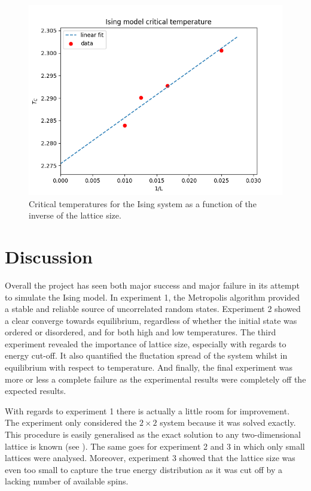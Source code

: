 \documentclass[nofootinbib,reprint,english]{revtex4-1}
\begin{document}
\begin{figure}[h!]
\centering
\includegraphics[scale=0.5]{../output/figures/experiment4/critical.png}
\caption{Critical temperatures for the Ising system as a function of the inverse of the lattice size.}\label{fig:experiment4_critical}
\end{figure}


\section{Discussion}
Overall the project has seen both major success and major failure in its attempt to simulate the Ising model. In experiment 1, the Metropolis algorithm provided a stable and reliable source of uncorrelated random states. Experiment 2 showed a clear converge towards equilibrium, regardless of whether the initial state was ordered or disordered, and for both high and low temperatures. The third experiment revealed the importance of lattice size, especially with regards to energy cut-off. It also quantified the fluctation spread of the system whilst in equilibrium with respect to temperature. And finally, the final experiment was more or less a complete failure as the experimental results were completely off the expected results.

With regards to experiment 1 there is actually a little room for improvement. The experiment only considered the \(2\times2\) system because it was solved exactly. This procedure is easily generalised as the exact solution to any two-dimensional lattice is known (see \citep{Onsager}). The same goes for experiment 2 and 3 in which only small lattices were analysed. Moreover, experiment 3 showed that the lattice size was even too small to capture the true energy distribution as it was cut off by a lacking number of available spins.
\end{document}
